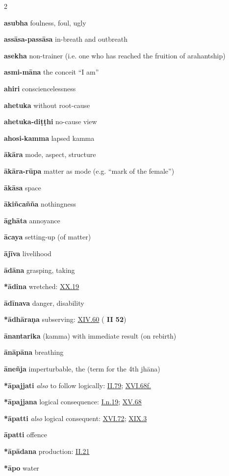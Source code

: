 \begin{multicols}{2}
\begin{vismHanging}
\par\textbf{asubha} foulness, foul, ugly 
\par\textbf{assāsa-passāsa} in-breath and outbreath 
\par\textbf{asekha} non-trainer (i.e. one who has reached the fruition of arahantship) 
\par\textbf{asmi-māna} the conceit “I am”
\par\textbf{ahiri} consciencelessness
\par\textbf{ahetuka} without root-cause
\par\textbf{ahetuka-diṭṭhi} no-cause view
\par\textbf{ahosi-kamma} lapsed kamma
\par\textbf{ākāra} mode, aspect, structure
\par\textbf{ākāra-rūpa} matter as mode (e.g. “mark of the female”) 
\par\textbf{ākāsa} space
\par\textbf{ākiñcañña} nothingness
\par\textbf{āghāta} annoyance
\par\textbf{ācaya} setting-up (of matter)
\par\textbf{ājīva} livelihood
\par\textbf{ādāna} grasping, taking
\par\textbf{*ādina} wretched: \hyperlink{XX.19}{XX.19}{}
\par\textbf{ādīnava} danger, disability
\par\textbf{*ādhāraṇa} subserving: \hyperlink{XIV.60}{XIV.60}{} (\textbf{\cite{M-a} II 52}) 
\par\textbf{ānantarika} (kamma) with immediate result (on rebirth)
\par\textbf{ānāpāna} breathing
\par\textbf{āneñja} imperturbable, the (term for the 4th jhāna) 
\par\textbf{*āpajjati} \emph{also }to follow logically: \hyperlink{II.79}{II.79}{}; \hyperlink{XVI.68}{XVI.68f.}{} 
\par\textbf{*āpajjana} logical consequence: \hyperlink{I.n19}{I.n.19}{}; \hyperlink{XV.68}{XV.68}{} 
\par\textbf{*āpatti} \emph{also }logical consequent: \hyperlink{XVI.72}{XVI.72}{}; \hyperlink{XIX.3}{XIX.3}{} 
\par\textbf{āpatti} offence
\par\textbf{*āpādana} production: \hyperlink{II.21}{II.21}{}
\par\textbf{*āpo} water 

\end{vismHanging}
\end{multicols}
